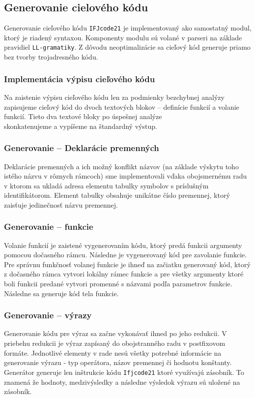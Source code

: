 \documentclass[a4paper, 11pt]{article}
\begin{document}
    \subsection{Generovanie cielového kódu}
    Generovanie cieľového kódu \texttt{IFJcode21} je implementovaný ako samostatný modul, ktorý je riadený syntaxou.
    Komponenty modulu sú volané v parseri na základe pravidiel \texttt{LL-gramatiky}. Z dôvodu neoptimalizácie sa cieľový kód
    generuje priamo bez tvorby trojadresného kódu.

    \subsubsection{Implementácia výpisu cieľového kódu}
    Na zaistenie výpisu cieľového kódu len za podmienky bezchybnej analýzy zapisujeme cieľový kód do dvoch textových
    blokov -- definície funkcií a volanie funkcií. Tieto dva textové bloky po úspešnej analýze\\ skonkatenujeme a
    vypíšeme na štandardný výstup.

    \subsubsection{Generovanie -- Deklarácie premenných}
    Deklarácie premenných a ich možný konflikt názvov (na základe výskytu toho istého názvu v rôznych rámcoch)
    sme implementovali vďaka obojsmernému radu v ktorom sa ukladá adresa elementu tabulky
    symbolov s príslušným identifikátorom. Element tabulky obsahuje unikátne číslo premennej, ktorý zaisťuje jedinečnosť
    názvu premennej.

    \subsubsection{Generovanie -- funkcie}
    Volanie funkcií je zaistené vygenerovaním kódu, ktorý predá funkcii argumenty pomocou dočasného rámcu. Následne
    je vygenerovaný kód pre zavolanie funkcie. Pre správnu funkčnosť volanej funkcie je ihneď na začiatku generovaný kód,
    ktorý z dočasného rámca vytvori lokálny rámec funkcie a pre všetky argumenty ktoré boli funkcii predané vytvori
    promenné s názvami podľa parametrov funkcie. Následne sa generuje kód tela funkcie.

    \subsubsection{Generovanie -- výrazy}
    Generovanie kódu pre výraz sa začne vykonávať ihned po jeho redukcii. V priebehu redukcii je výraz zapísaný do obojstranného radu
    v postfixovom formáte. Jednotlivé elementy v rade nesú všetky potrebné
    informácie na generovanie výrazu - typ operátora, názov premennej či hodnotu konštanty. Generátor generuje len inštrukcie
    kódu \texttt{Ifjcode21} ktoré využívajú zásobník. To znamená že hodnoty, medzivýsledky a následne výsledok výrazu sú
    uložené na zásobník.
\end{document}
